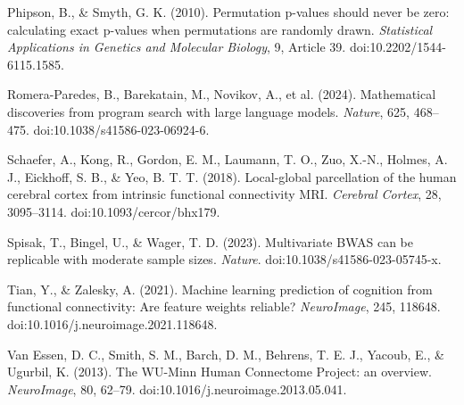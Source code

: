 \documentclass[11pt,letterpaper]{report}
\begin{document}
Phipson, B., \& Smyth, G. K. (2010). Permutation p-values should never be zero: calculating exact p-values when permutations are randomly drawn. \emph{Statistical Applications in Genetics and Molecular Biology}, 9, Article 39. doi:10.2202/1544-6115.1585.

Romera-Paredes, B., Barekatain, M., Novikov, A., et al. (2024). Mathematical discoveries from program search with large language models. \emph{Nature}, 625, 468--475. doi:10.1038/s41586-023-06924-6.

Schaefer, A., Kong, R., Gordon, E. M., Laumann, T. O., Zuo, X.-N., Holmes, A. J., Eickhoff, S. B., \& Yeo, B. T. T. (2018). Local-global parcellation of the human cerebral cortex from intrinsic functional connectivity MRI. \emph{Cerebral Cortex}, 28, 3095--3114. doi:10.1093/cercor/bhx179.

Spisak, T., Bingel, U., \& Wager, T. D. (2023). Multivariate BWAS can be replicable with moderate sample sizes. \emph{Nature}. doi:10.1038/s41586-023-05745-x.

Tian, Y., \& Zalesky, A. (2021). Machine learning prediction of cognition from functional connectivity: Are feature weights reliable? \emph{NeuroImage}, 245, 118648. doi:10.1016/j.neuroimage.2021.118648.

Van Essen, D. C., Smith, S. M., Barch, D. M., Behrens, T. E. J., Yacoub, E., \& Ugurbil, K. (2013). The WU-Minn Human Connectome Project: an overview. \emph{NeuroImage}, 80, 62--79. doi:10.1016/j.neuroimage.2013.05.041.
\end{document}
